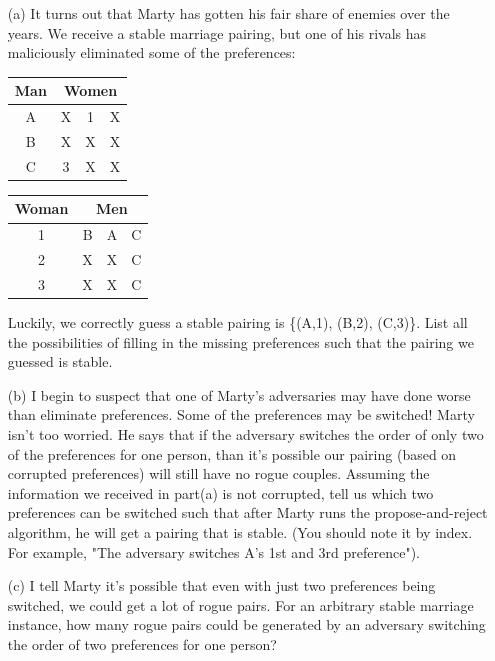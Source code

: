 \documentclass[11pt]{article}
\newif\ifsolutions
\begin{document}
\begin{qunlist}
        

\begin{itemize}
\item[(a)] It turns out that Marty has gotten his fair share of enemies over the years. 
We receive a stable marriage pairing, but one of his rivals has maliciously eliminated some of the preferences:

\begin{center}
\begin{tabular}{|c|ccc|}\hline 
Man&\multicolumn{3}{|c|}{Women}\\\hline 
A&X&1&X\\\hline 
B&X&X&X\\\hline 
C&3&X&X\\\hline
\end{tabular} 
\hspace{2cm}
\begin{tabular}{|c|ccc|}\hline 
Woman&\multicolumn{3}{|c|}{Men}\\\hline 
1&B&A&C\\\hline 
2&X&X&C\\\hline 
3&X&X&C\\\hline
\end{tabular}
\end{center}
        
Luckily, we correctly guess a stable pairing is \{(A,1), (B,2), (C,3)\}. 
List all the possibilities of filling in the missing preferences such that the pairing we guessed is stable.

\ifsolutions
\textbf{Solutions:}
\fi
 
        
\item[(b)] I begin to suspect that one of Marty's adversaries may have done worse than eliminate preferences. 
Some of the preferences may be switched! Marty isn't too worried. 
He says that if the adversary switches the order of only two of the preferences for one person, 
than it's possible our pairing (based on corrupted preferences) will still have no rogue couples. 
Assuming the information we received in part(a) is not corrupted, 
tell us which two preferences can be switched such that after Marty runs the propose-and-reject algorithm, 
he will get a pairing that is stable. 
(You should note it by index. For example, "The adversary switches A's 1st and 3rd preference").

\ifsolutions
\textbf{Solutions:}
\fi

        
\item[(c)] I tell Marty it's possible that even with just two preferences being switched, 
we could get a lot of rogue pairs. For an arbitrary stable marriage instance, 
how many rogue pairs could be generated by an adversary switching the order of two preferences for one person?


\end{itemize}
\end{qunlist}
\end{document}
